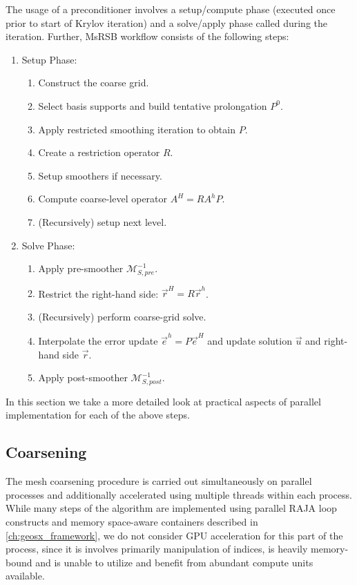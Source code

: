 The usage of a preconditioner involves a setup/compute phase (executed once prior to start of Krylov iteration) and a solve/apply phase called during the iteration.   Further, MsRSB workflow consists of the following steps:
\begin{enumerate}
\item Setup Phase:
    \begin{enumerate}
        \item Construct the coarse grid.
        \item Select basis supports and build tentative prolongation $P^0$.
        \item Apply restricted smoothing iteration  to obtain $P$.
        \item Create a restriction operator $R$.
        \item Setup smoothers if necessary.
        \item Compute coarse-level operator $A^H = RA^hP$.
        \item (Recursively) setup next level.
    \end{enumerate}
\item Solve Phase:
    \begin{enumerate}
        \item Apply pre-smoother $\mathcal{M}_{S,pre}^{-1}$.
        \item Restrict the right-hand side: $\vec{r}^H = R\vec{r}^h$.
        \item (Recursively) perform coarse-grid solve.
        \item Interpolate the error update $\vec{e}^h = P\vec{e}^H$ and update solution $\vec{u}$ and right-hand side $\vec{r}$.
        \item Apply post-smoother $\mathcal{M}_{S,post}^{-1}$.
    \end{enumerate}
\end{enumerate}
In this section we take a more detailed look at practical aspects of parallel implementation for each of the above steps.

\subsection{Coarsening}
\label{subsec:par_kernels_coarsening}

The mesh coarsening procedure is carried out simultaneously on parallel processes and additionally accelerated using multiple threads within each process.   While many steps of the algorithm are implemented using parallel RAJA loop constructs and memory space-aware containers described in \cref{ch:geosx_framework}, we do not consider GPU acceleration for this part of the process, since it is involves primarily manipulation of indices, is heavily memory-bound and is unable to utilize and benefit from abundant compute units available.
 
